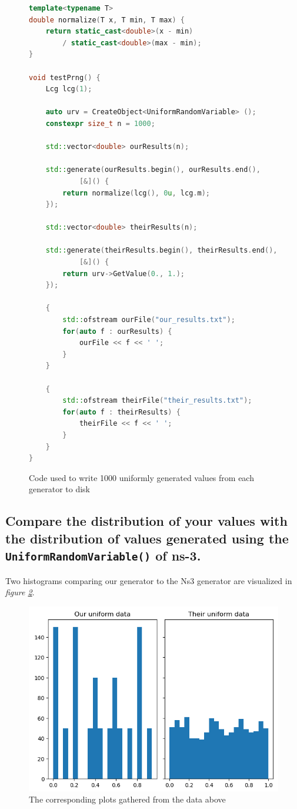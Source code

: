 \documentclass[a4paper, titlepage,12pt]{article}
\begin{document}
		\begin{figure}[h!]
			\begin{lstlisting}[language=c++]
template<typename T>
double normalize(T x, T min, T max) {
	return static_cast<double>(x - min) 
		/ static_cast<double>(max - min);
}

void testPrng() {
	Lcg lcg(1);

	auto urv = CreateObject<UniformRandomVariable> ();
	constexpr size_t n = 1000;

	std::vector<double> ourResults(n);

	std::generate(ourResults.begin(), ourResults.end(), 
			[&]() {
		return normalize(lcg(), 0u, lcg.m);
	});

	std::vector<double> theirResults(n);

	std::generate(theirResults.begin(), theirResults.end(), 
			[&]() {
		return urv->GetValue(0., 1.);
	});

	{
		std::ofstream ourFile("our_results.txt");
		for(auto f : ourResults) {
			ourFile << f << ' ';
		}
	}

	{
		std::ofstream theirFile("their_results.txt");
		for(auto f : theirResults) {
			theirFile << f << ' ';
		}
	}
}
			\end{lstlisting}
			\caption{Code used to write 1000 uniformly generated values from each generator to disk}
			\label{fig:uniformcode}
		\end{figure}
		\pagebreak

		\subsection{Compare the distribution of your values with the distribution of values generated using the \\
		\lstinline{UniformRandomVariable()} of ns-3.}
		Two histograms comparing our generator to the Ns3 generator are visualized in \textit{figure \ref{uniform_plots}}.
		\begin{figure}[h!]
			\begin{center}
				\includegraphics[scale=0.8]{./uniform_histogram_plot.png}
				\caption{The corresponding plots gathered from the data above}
				\label{uniform_plots}
			\end{center}
		\end{figure}
\end{document}
